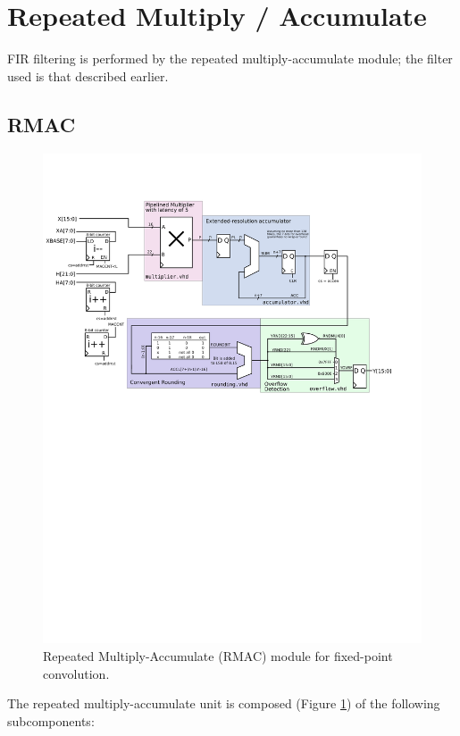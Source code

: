 \section{Repeated Multiply / Accumulate } 
FIR filtering is performed by the repeated multiply-accumulate module; the filter used is that described earlier. 

\subsection{RMAC}
\begin{figure}
\label{rmac}
\includegraphics[width=6in]{RMAC.svg}
\caption{Repeated Multiply-Accumulate (RMAC) module for fixed-point convolution.}
\end{figure} 
The repeated multiply-accumulate unit is composed (Figure \ref{rmac}) of the following subcomponents:

